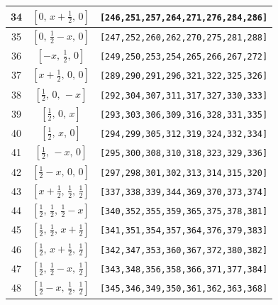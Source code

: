\documentclass[fleqn,8pt]{jsarticle}
\begin{document}
\begin{longtable}{ccc}
34 & $\left[ 0,\, x + \frac{1}{2},\, 0 \right]$ & {\tt [246,251,257,264,271,276,284,286]} \\ \hline
35 & $\left[ 0,\, \frac{1}{2} - x,\, 0 \right]$ & {\tt [247,252,260,262,270,275,281,288]} \\ \hline
36 & $\left[ - x,\, \frac{1}{2},\, 0 \right]$ & {\tt [249,250,253,254,265,266,267,272]} \\ \hline
37 & $\left[ x + \frac{1}{2},\, 0,\, 0 \right]$ & {\tt [289,290,291,296,321,322,325,326]} \\ \hline
38 & $\left[ \frac{1}{2},\, 0,\, - x \right]$ & {\tt [292,304,307,311,317,327,330,333]} \\ \hline
39 & $\left[ \frac{1}{2},\, 0,\, x \right]$ & {\tt [293,303,306,309,316,328,331,335]} \\ \hline
40 & $\left[ \frac{1}{2},\, x,\, 0 \right]$ & {\tt [294,299,305,312,319,324,332,334]} \\ \hline
41 & $\left[ \frac{1}{2},\, - x,\, 0 \right]$ & {\tt [295,300,308,310,318,323,329,336]} \\ \hline
42 & $\left[ \frac{1}{2} - x,\, 0,\, 0 \right]$ & {\tt [297,298,301,302,313,314,315,320]} \\ \hline
43 & $\left[ x + \frac{1}{2},\, \frac{1}{2},\, \frac{1}{2} \right]$ & {\tt [337,338,339,344,369,370,373,374]} \\ \hline
44 & $\left[ \frac{1}{2},\, \frac{1}{2},\, \frac{1}{2} - x \right]$ & {\tt [340,352,355,359,365,375,378,381]} \\ \hline
45 & $\left[ \frac{1}{2},\, \frac{1}{2},\, x + \frac{1}{2} \right]$ & {\tt [341,351,354,357,364,376,379,383]} \\ \hline
46 & $\left[ \frac{1}{2},\, x + \frac{1}{2},\, \frac{1}{2} \right]$ & {\tt [342,347,353,360,367,372,380,382]} \\ \hline
47 & $\left[ \frac{1}{2},\, \frac{1}{2} - x,\, \frac{1}{2} \right]$ & {\tt [343,348,356,358,366,371,377,384]} \\ \hline
48 & $\left[ \frac{1}{2} - x,\, \frac{1}{2},\, \frac{1}{2} \right]$ & {\tt [345,346,349,350,361,362,363,368]} \\
\end{longtable}
\renewcommand{\arraystretch}{1.2}
\end{document}
